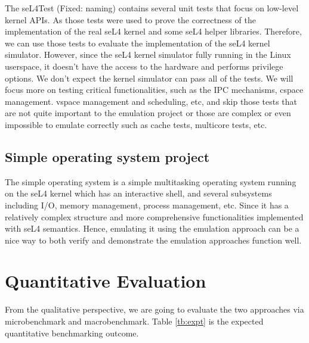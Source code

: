 The seL4Test (Fixed: naming) contains several unit tests that focus on low-level kernel APIs. As those tests were used to prove the correctness of the implementation of the real seL4 kernel and some seL4 helper libraries. Therefore, we can use those tests to evaluate the implementation of the seL4 kernel simulator. However, since the seL4 kernel simulator fully running in the Linux userspace, it doesn't have the access to the hardware and performs privilege options. We don't expect the kernel simulator can pass all of the tests. We will focus more on testing critical functionalities, such as the IPC mechanisms, cspace management. vspace management and scheduling, etc, and skip those tests that are not quite important to the emulation project or those are complex or even impossible to emulate correctly such as cache tests, multicore tests, etc.

\subsection{Simple operating system project}

The simple operating system is a simple multitasking operating system running on the seL4 kernel which has an interactive shell, and several subsystems including I/O, memory management, process management, etc. Since it has a relatively complex structure and more comprehensive functionalities implemented with seL4 semantics. Hence, emulating it using the emulation approach can be a nice way to both verify and demonstrate the emulation approaches function well.

\section{Quantitative Evaluation}

From the qualitative perspective, we are going to evaluate the two approaches via microbenchmark and macrobenchmark. Table \ref{tb:expt} is the expected quantitative benchmarking outcome.

